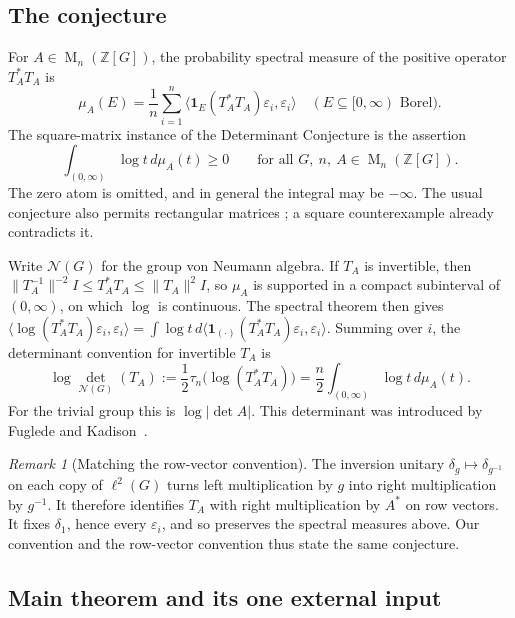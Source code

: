 \documentclass[11pt]{article}
\theoremstyle{remark}
\newtheorem{remark}[theorem]{Remark}
\numberwithin{equation}{section}
\newcommand{\Z}{\mathbb Z}
\newcommand{\Mat}{\operatorname{M}}
\newcommand{\N}{\mathcal N}
\begin{document}
\subsection{The conjecture}

For $A\in\Mat_n(\Z[G])$, the probability spectral measure of the positive operator $T_A^*T_A$ is
\[
 \mu_A(E)=\frac1n\sum_{i=1}^n
 \langle \mathbf1_E(T_A^*T_A)\varepsilon_i,\varepsilon_i\rangle
 \quad(E\subseteq[0,\infty)\text{ Borel}).
\]
The square-matrix instance of the Determinant Conjecture is the assertion
\begin{equation}\label{eq:conjecture}
 \int_{(0,\infty)}\log t\,d\mu_A(t)\ge0\qquad\text{for all }G,\ n,\ A\in\Mat_n(\Z[G]).
\end{equation}
The zero atom is omitted, and in general the integral may be $-\infty$. The usual conjecture also permits rectangular matrices \cite[Conjecture 13.2]{Luck2002}; a square counterexample already contradicts it.

Write $\N(G)$ for the group von Neumann algebra. If $T_A$ is invertible, then $\|T_A^{-1}\|^{-2}I\le T_A^*T_A\le\|T_A\|^2I$, so $\mu_A$ is supported in a compact subinterval of $(0,\infty)$, on which $\log$ is continuous. The spectral theorem then gives $\langle\log(T_A^*T_A)\varepsilon_i,\varepsilon_i\rangle=\int\log t\,d\langle\mathbf 1_{(\cdot)}(T_A^*T_A)\varepsilon_i,\varepsilon_i\rangle$. Summing over $i$, the determinant convention for invertible $T_A$ is
\begin{equation}\label{eq:normalization}
 \log\det_{\N(G)}(T_A)
 :=\frac12\tau_n\bigl(\log(T_A^*T_A)\bigr)
 =\frac n2\int_{(0,\infty)}\log t\,d\mu_A(t).
\end{equation}
For the trivial group this is $\log|\det A|$. This determinant was introduced by Fuglede and Kadison~\cite{FK1952}.

\begin{remark}[Matching the row-vector convention]\label{rem:convention}
The inversion unitary $\delta_g\mapsto\delta_{g^{-1}}$ on each copy of $\ell^2(G)$ turns left multiplication by $g$ into right multiplication by $g^{-1}$. It therefore identifies $T_A$ with right multiplication by $A^*$ on row vectors. It fixes $\delta_1$, hence every $\varepsilon_i$, and so preserves the spectral measures above. Our convention and the row-vector convention thus state the same conjecture.
\end{remark}

\subsection{Main theorem and its one external input}
\end{document}

